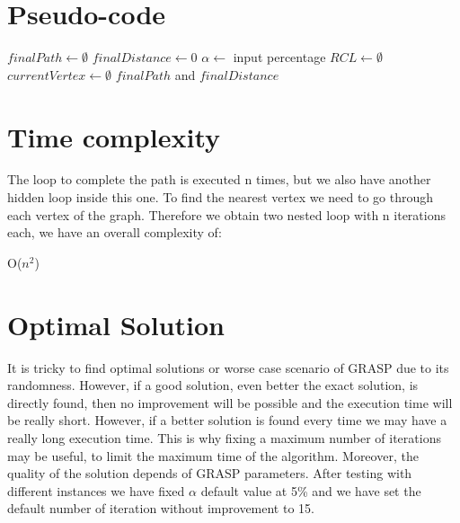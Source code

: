 \documentclass[a4paper, 12pt]{report}
\begin{document}
		\section{Pseudo-code}
			\begin{algorithm}
				\DontPrintSemicolon
				\BlankLine
				$finalPath \leftarrow \emptyset$\;
				$finalDistance \leftarrow 0$\;
				\BlankLine
				$\alpha \leftarrow$ input percentage\;
				$RCL \leftarrow \emptyset$\;
				$currentVertex \leftarrow \emptyset$\;
				\BlankLine
				\BlankLine
				\Return $finalPath$ and $finalDistance$\;
			\end{algorithm}
		\section{Time complexity}
		The loop to complete the path is executed n times, but we also have another hidden loop inside this one. To find the nearest vertex we need to go through each vertex of the graph. Therefore we obtain two nested loop with n iterations each, we have an overall complexity of:
		\begin{center}
			O($n^{2}$)
		\end{center}
		\section{Optimal Solution}
		It is tricky to find optimal solutions or worse case scenario of GRASP due to its randomness. However, if a good solution, even better the exact solution, is directly found, then no improvement will be possible and the execution time will be really short. However, if a better solution is found every time we may have a really long execution time. This is why fixing a maximum number of iterations may be useful, to limit the maximum time of the algorithm. Moreover, the quality of the solution depends of GRASP parameters. After testing with different instances we have fixed $\alpha$ default value at 5\% and we have set the default number of iteration without improvement to 15.
\end{document}
